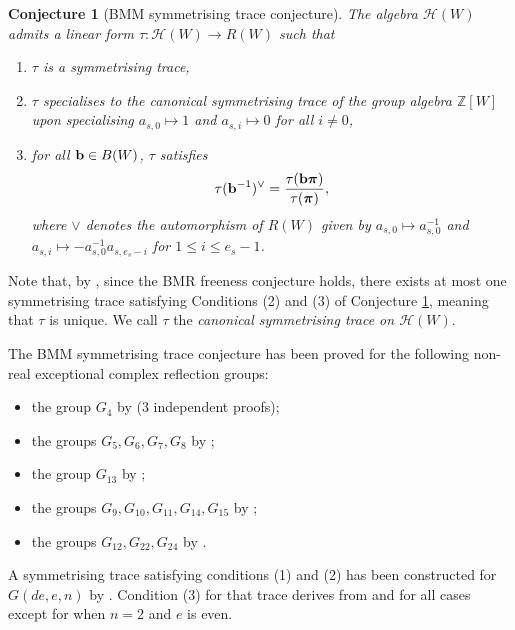 \documentclass[11pt, reqno]{amsart}
\newcommand{\cH}{\mathcal{H}}
\newcommand{\bZ}{\mathbb{Z}}
\newcommand{\bp}{\boldsymbol\pi}
\numberwithin{equation}{section}
\newtheorem{conjecture}[theorem]{Conjecture}
\theoremstyle{remark}
\begin{document}
	\begin{conjecture}[BMM symmetrising trace conjecture]\label{bmmconj}
		The algebra $\cH(W)$ admits a linear form $\tau: \cH(W)\rightarrow R(W)$ such that 
		\begin{enumerate}
			\item $\tau$ is a symmetrising trace, 
			\item $\tau$ specialises to the canonical symmetrising trace of the group algebra $\bZ[W]$ upon specialising $a_{s,0}\mapsto 1$ and $a_{s,i}\mapsto 0$ for all $i\neq 0$,
			\item for all ${\bf b} \in B(W)$, $\tau$ satisfies
			$$\tau({{\bf b}^{-1}})^{\vee}=\frac{\tau({{\bf b}\bp})}{\tau({\bp})},$$
			where $\vee$ denotes the automorphism of  $R(W)$ given by $a_{s,0} \mapsto a_{s,0}^{-1}$ and $a_{s,i} \mapsto -a_{s,0}^{-1}a_{s,e_s-i}$ for $1\le i\le e_s-1$.
		\end{enumerate}
	\end{conjecture}
	
	
	Note that, by  \cite[2.1]{BMM}, since the BMR freeness conjecture holds,  there exists at most
	one symmetrising trace satisfying Conditions (2) and (3) of Conjecture \ref{bmmconj}, meaning that $\tau$ is unique. We call $\tau$ the \emph{canonical symmetrising trace on  $\mathcal{H}(W)$}. 
	
	
	The BMM symmetrising trace conjecture has been proved for the following non-real exceptional complex reflection groups:
	\begin{itemize}
		\item the group $G_4$ by \cite{MM10, Mar46, BCCK} (3 independent proofs); \smallbreak
		\item the groups $G_5, G_6, G_7, G_8$ by \cite{BCCK}; \smallbreak
		\item the group $G_{13}$ by \cite{BCC}; \smallbreak
		\item the groups $G_9, G_{10}, G_{11}, G_{14}, G_{15}$ by \cite{ChPf}; \smallbreak
		\item the groups $G_{12}, G_{22}, G_{24}$ by \cite{MM10}.
	\end{itemize}	
	A symmetrising trace satisfying conditions (1) and (2) has been constructed for  $G(de,e,n)$ by \cite{BreMa, MM98}. Condition (3) for that trace derives from \cite[Lemma 2.7]{BMM} and  \cite[Theorem 5.2]{GIM} for all cases except for when $n=2$ and $e$ is even.
	
	
	
\end{document}
